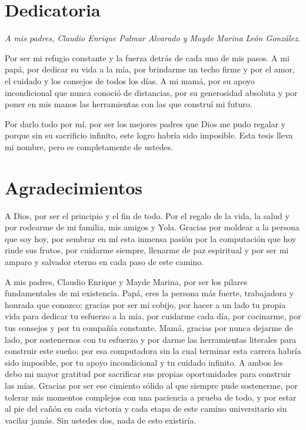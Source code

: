 \documentclass[12pt, a4paper]{article}
\begin{document}
\section*{Dedicatoria}
{\itshape
A mis padres, Claudio Enrique Palmar Alvarado y Mayde Marina León González.

Por ser mi refugio constante y la fuerza detrás de cada uno de mis pasos. A mi papá, por dedicar su vida a la mía, por brindarme un techo firme y por el amor, el cuidado y los consejos de todos los días. A mi mamá, por su apoyo incondicional que nunca conoció de distancias, por su generosidad absoluta y por poner en mis manos las herramientas con las que construí mi futuro.

Por darlo todo por mí, por ser los mejores padres que Dios me pudo regalar y porque sin su sacrificio infinito, este logro habría sido imposible. Esta tesis lleva mi nombre, pero es completamente de ustedes.
\par}

\newpage
\thispagestyle{empty}
\section*{Agradecimientos}

A Dios, por ser el principio y el fin de todo. Por el regalo de la vida, la salud y por rodearme de mi familia, mis amigos y Yola. Gracias por moldear a la persona que soy hoy, por sembrar en mí esta inmensa pasión por la computación que hoy rinde sus frutos, por cuidarme siempre, llenarme de paz espiritual y por ser mi amparo y salvador eterno en cada paso de este camino.

A mis padres, Claudio Enrique y Mayde Marina, por ser los pilares fundamentales de mi existencia. Papá, eres la persona más fuerte, trabajadora y honrada que conozco; gracias por ser mi cobijo, por hacer a un lado tu propia vida para dedicar tu esfuerzo a la mía, por cuidarme cada día, por cocinarme, por tus consejos y por tu compañía constante. Mamá, gracias por nunca dejarme de lado, por sostenernos con tu esfuerzo y por darme las herramientas literales para construir este sueño: por esa computadora sin la cual terminar esta carrera habría sido imposible, por tu apoyo incondicional y tu cuidado infinito. A ambos les debo mi mayor gratitud por sacrificar sus propias oportunidades para construir las mías. Gracias por ser ese cimiento sólido al que siempre pude sostenerme, por tolerar mis momentos complejos con una paciencia a prueba de todo, y por estar al pie del cañón en cada victoria y cada etapa de este camino universitario sin vacilar jamás. Sin ustedes dos, nada de esto existiría.
\end{document}
